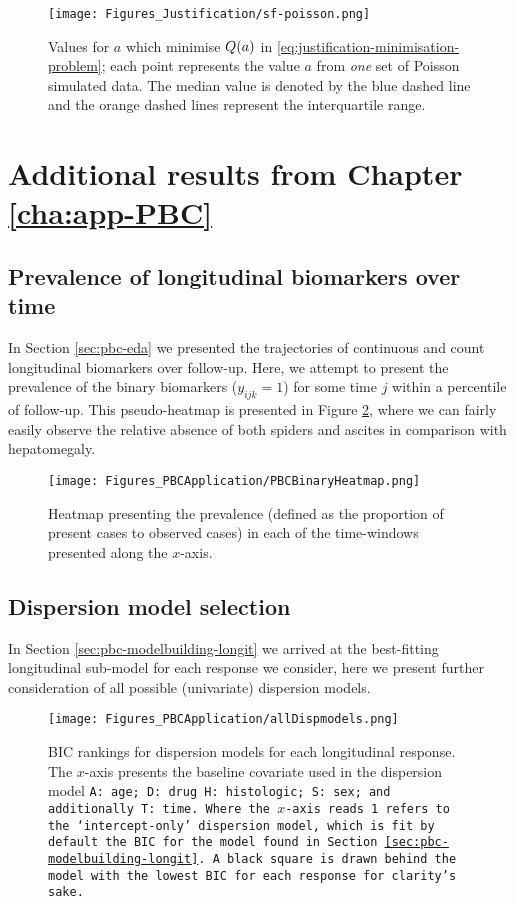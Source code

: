 \begin{figure}[ht]
    \centering
    \texttt{[image: Figures\_Justification/sf-poisson.png]}
    \caption{Values for $a$ which minimise $Q\!\left( a\right)$ in \eqref{eq:justification-minimisation-problem}; each point represents the value $a$ from \textit{one} set of Poisson simulated data. The median value is denoted by the blue dashed line and the orange dashed lines represent the interquartile range.}
    \label{fig:justification-scalefactor-poisson}
\end{figure}
\clearpage
\resettocappx
\section{Additional results from Chapter \ref{cha:app-PBC}}\label{sec:appendix-suppfigs-PBC}
\rmtoc
\subsection{Prevalence of longitudinal biomarkers over time}\label{sec:appendix-suppfigs-binaryheatmap}
In Section \ref{sec:pbc-eda} we presented the trajectories of continuous and count longitudinal biomarkers over follow-up. Here, we attempt to present the prevalence of the binary biomarkers (\ie $y_{ijk}=1$) for some time $j$ within a percentile of follow-up. This pseudo-heatmap is presented in Figure \ref{fig:appendix-suppfigs-PBC-binaryheatmap}, where we can fairly easily observe the relative absence of both spiders and ascites in comparison with hepatomegaly.

\begin{figure}[ht]
    \centering
    \texttt{[image: Figures\_PBCApplication/PBCBinaryHeatmap.png]}
    \caption{Heatmap presenting the prevalence (defined as the proportion of present cases to observed cases) in each of the time-windows presented along the $x$-axis.}
    \label{fig:appendix-suppfigs-PBC-binaryheatmap}
\end{figure}

\subsection{Dispersion model selection}\label{sec:appendix-suppfigs-PBC-dispmodels}
In Section \ref{sec:pbc-modelbuilding-longit} we arrived at the best-fitting longitudinal sub-model for each response we consider, here we present further consideration of all possible (univariate) dispersion models.
\begin{figure}[ht]
    \centering
    \texttt{[image: Figures\_PBCApplication/allDispmodels.png]}
    \caption{BIC rankings for dispersion models for each longitudinal response. The $x$-axis presents the baseline covariate used in the dispersion model \tt{A}: \tt{age}; \tt{D}: \tt{drug} \tt{H}: \tt{histologic}; \tt{S}: \tt{sex}; and additionally \tt{T}: \tt{time}. Where the $x$-axis reads \tt{1} refers to the `intercept-only' dispersion model, which is fit by default \ie the BIC for the model found in Section \ref{sec:pbc-modelbuilding-longit}. A black square is drawn behind the model with the lowest BIC for each response for clarity's sake.}
    \label{fig:appendix-suppfigs-PBC-dispmodels}
\end{figure}

